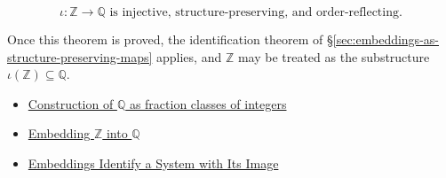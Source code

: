 \begin{remark*}
\[
\iota:\mathbb{Z}\to \mathbb{Q} \text{ is injective, structure-preserving, and order-reflecting.}
\]
\end{remark*}
\begin{remark*}[Interpretation]
Once this theorem is proved, the identification theorem of \S\ref{sec:embeddings-as-structure-preserving-maps} applies, and $\mathbb{Z}$ may be treated as the substructure $\iota(\mathbb{Z})\subseteq \mathbb{Q}$.
\end{remark*}
\begin{dependencies}
\begin{itemize}
  \item \hyperref[def:rationals]{Construction of $\mathbb{Q}$ as fraction classes of integers}
  \item \hyperref[def:embedding-z-into-q]{Embedding $\mathbb{Z}$ into $\mathbb{Q}$}
  \item \hyperref[thm:embedding-identifies-with-image]{Embeddings Identify a System with Its Image}
\end{itemize}
\end{dependencies}
